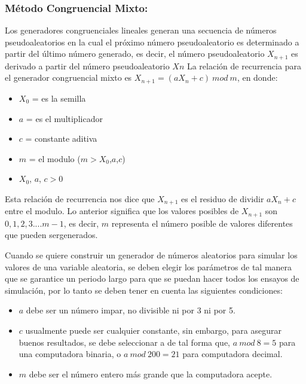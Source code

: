\documentclass[doc, donotrepeattitle, biblatex, apacite]{apa6}
\begin{document}
\subsubsection{Método Congruencial Mixto:}
Los generadores congruenciales
lineales generan una secuencia de números pseudoaleatorios en la cual el
próximo número pseudoaleatorio es determinado a partir del último número
generado, es decir, el número pseudoaleatorio $X_{n+1}$ es derivado a partir del
número pseudoaleatorio $Xn$
La relación de recurrencia para el generador
congruencial mixto es $X_{n+1} =(a X_{n}+c) \ mod \ m$, en donde:
\begin{itemize}
\item $X_{0}$ = es la semilla
\item $a$ = es el multiplicador
\item $c$ = constante aditiva
\item $m$ = el modulo ($m > X_{0}$,$a$,$c$)
\item $X_{0}$, $a$, $c > 0$
\end{itemize}

Esta relación de recurrencia nos dice que $X_{n+1}$ es el residuo de dividir $aX_{n}+c$ entre
el modulo. Lo anterior significa que los valores posibles de $X_{n+1}$ son $0,1,2,3 ....m-1$,
es decir, $m$ representa el número posible de valores diferentes que pueden sergenerados.

Cuando se quiere construir un generador de números aleatorios para simular los
valores de una variable aleatoria, se deben elegir los parámetros de tal manera
que se garantice un periodo largo para que se puedan hacer todos los ensayos de
simulación, por lo tanto se deben tener en cuenta las siguientes condiciones:
\begin{itemize}
\item $a$ debe ser un número impar, no divisible ni por 3 ni por 5.
\item $c$ usualmente puede ser cualquier constante, sin embargo, para asegurar
buenos resultados, se debe seleccionar a de tal forma que, $a \ mod \ 8 = 5$ para
una computadora binaria, o $a \ mod \ 200 = 21$ para computadora decimal.
\item $m$ debe ser el número entero más grande que la computadora acepte.

\end{itemize}
\end{document}
